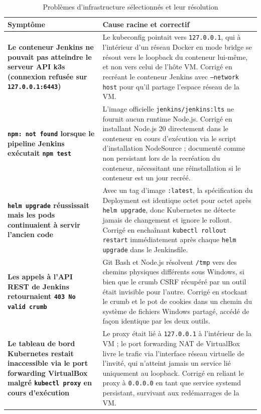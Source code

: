 \documentclass[12pt,a4paper,oneside]{report}
\begin{document}
\begin{table}[H]\centering
\caption{Problèmes d'infrastructure sélectionnés et leur résolution}\label{tab:infraissues}
\renewcommand{\arraystretch}{1.3}
\begin{tabularx}{\textwidth}{>{\bfseries\color{primary}}p{4.0cm} Y}
\toprule
{} Symptôme & Cause racine et correctif \\
\midrule
Le conteneur Jenkins ne pouvait pas atteindre le serveur API k3s (connexion refusée sur \texttt{127.0.0.1:6443}) & Le kubeconfig pointait vers \texttt{127.0.0.1}, qui à l'intérieur d'un réseau Docker en mode bridge se résout vers le loopback du conteneur lui-même, et non vers celui de l'hôte VM. Corrigé en recréant le conteneur Jenkins avec \texttt{--network host} pour qu'il partage l'espace réseau de la VM. \\
\texttt{npm: not found} lorsque le pipeline Jenkins exécutait \texttt{npm test} & L'image officielle \texttt{jenkins/jenkins:lts} ne fournit aucun runtime Node.js. Corrigé en installant Node.js 20 directement dans le conteneur en cours d'exécution via le script d'installation NodeSource ; documenté comme non persistant lors de la recréation du conteneur, nécessitant une réinstallation si le conteneur est un jour recréé. \\
\texttt{helm upgrade} réussissait mais les pods continuaient à servir l'ancien code & Avec un tag d'image \texttt{:latest}, la spécification du Deployment est identique octet pour octet après \texttt{helm upgrade}, donc Kubernetes ne détecte jamais de changement et ignore le rollout. Corrigé en enchaînant \texttt{kubectl rollout restart} immédiatement après chaque \texttt{helm upgrade} dans le Jenkinsfile. \\
Les appels à l'API REST de Jenkins retournaient \texttt{403 No valid crumb} & Git Bash et Node.js résolvent \texttt{/tmp} vers des chemins physiques différents sous Windows, si bien que le crumb CSRF récupéré par un outil était invisible pour l'autre. Corrigé en stockant le crumb et le pot de cookies dans un chemin du système de fichiers Windows partagé, accédé de façon identique par les deux outils. \\
Le tableau de bord Kubernetes restait inaccessible via le port forwarding VirtualBox malgré \texttt{kubectl proxy} en cours d'exécution & Le proxy était lié à \texttt{127.0.0.1} à l'intérieur de la VM ; le port forwarding NAT de VirtualBox livre le trafic via l'interface réseau virtuelle de l'invité, qui n'atteint jamais un service lié uniquement au loopback. Corrigé en reliant le proxy à \texttt{0.0.0.0} en tant que service systemd persistant, survivant aux redémarrages de la VM. \\
\bottomrule
\end{tabularx}
\end{table}
\end{document}
